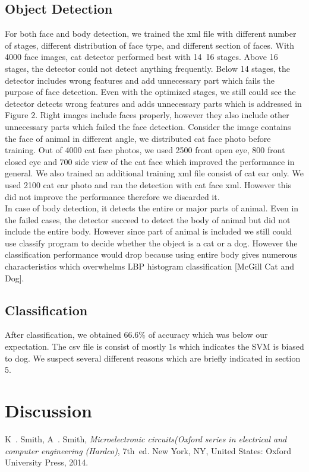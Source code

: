 \documentclass[conference,compsoc]{IEEEtran}
\begin{document}
\subsection{Object Detection}
For both face and body detection, we trained the xml file with different number of stages, different distribution of face type, and different section of faces. With 4000 face images, cat detector performed best with 14~16 stages. Above 16 stages, the detector could not detect anything frequently. Below 14 stages, the detector includes wrong features and add unnecessary part which fails the purpose of face detection. Even with the optimized stages, we still could see the detector detects wrong features and adds unnecessary parts which is addressed in Figure 2. Right images include faces properly, however they also include other unnecessary parts which failed the face detection. Consider the image contains the face of animal in different angle, we distributed cat face photo before training. Out of 4000 cat face photos, we used 2500 front open eye, 800 front closed eye and 700 side view of the cat face which improved the performance in general. We also trained an additional training xml file consist of cat ear only. We used 2100 cat ear photo and ran the detection with cat face xml. However this did not improve the performance therefore we discarded it.\\

In case of body detection, it detects the entire or major parts of animal. Even in the failed cases, the detector succeed to detect the body of animal but did not include the entire body. However since part of animal is included we still could use classify program to decide whether the object is a cat or a dog. However the classification performance would drop because using entire body gives numerous characteristics which overwhelms LBP histogram classification [McGill Cat and Dog].
\subsection{Classification}
After classification, we obtained 66.6\% of accuracy which was below our expectation. The csv file is consist of mostly 1s which indicates the SVM is biased to dog. We suspect several different reasons which are briefly indicated in section 5.
\section{Discussion}


\begin{thebibliography}{1}

K~. Smith, A~. Smith, \emph{Microelectronic circuits(Oxford series in electrical and computer engineering (Hardco)}, 7th~ed. New York, NY, United States: Oxford University Press, 2014.

\end{thebibliography}

\onecolumn
\end{document}
